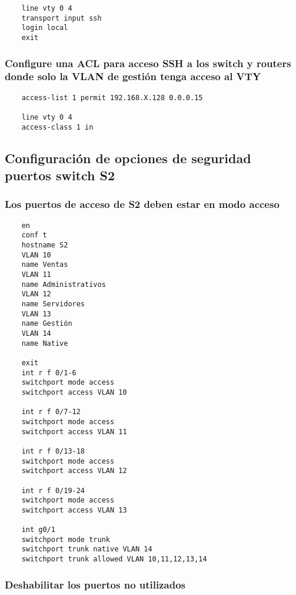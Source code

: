 \documentclass[twocolumn]{article}
\begin{document}
    \begin{verbatim}
    line vty 0 4
    transport input ssh
    login local
    exit
    \end{verbatim}
    
    \subsubsection*{Configure una ACL para acceso SSH a los switch y routers donde solo la VLAN de gestión tenga acceso al VTY}
    
    \begin{verbatim}
    access-list 1 permit 192.168.X.128 0.0.0.15
    
    line vty 0 4
    access-class 1 in
    \end{verbatim}
    
    \subsection*{Configuración de opciones de seguridad puertos switch S2}
    
    \subsubsection*{Los puertos de acceso de S2 deben estar en modo acceso}
    
    \begin{verbatim}
    en
    conf t
    hostname S2
    VLAN 10
    name Ventas
    VLAN 11
    name Administrativos
    VLAN 12
    name Servidores
    VLAN 13
    name Gestión
    VLAN 14
    name Native
    
    exit
    int r f 0/1-6
    switchport mode access
    switchport access VLAN 10
    
    int r f 0/7-12
    switchport mode access
    switchport access VLAN 11
    
    int r f 0/13-18
    switchport mode access
    switchport access VLAN 12
    
    int r f 0/19-24
    switchport mode access
    switchport access VLAN 13
    
    int g0/1
    switchport mode trunk
    switchport trunk native VLAN 14
    switchport trunk allowed VLAN 10,11,12,13,14
    \end{verbatim}
    
    \subsubsection*{Deshabilitar los puertos no utilizados}
    
\end{document}
